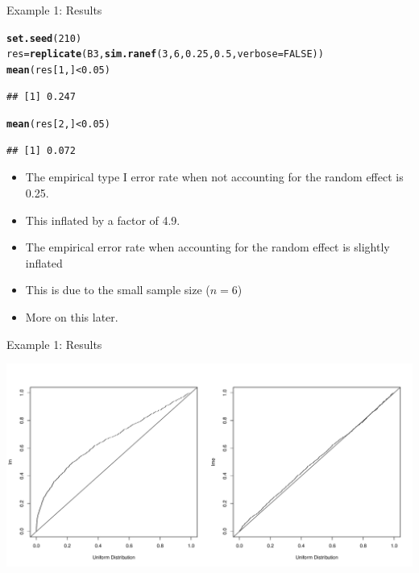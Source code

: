 \documentclass[xcolor=x11names,compress]{beamer}\usepackage[]{graphicx}\usepackage[]{color}
\makeatletter
\newcommand{\hlnum}[1]{\textcolor[rgb]{0.686,0.059,0.569}{#1}}%
\newcommand{\hlopt}[1]{\textcolor[rgb]{0,0,0}{#1}}%
\newcommand{\hlstd}[1]{\textcolor[rgb]{0.345,0.345,0.345}{#1}}%
\newcommand{\hlkwb}[1]{\textcolor[rgb]{0.69,0.353,0.396}{#1}}%
\newcommand{\hlkwc}[1]{\textcolor[rgb]{0.333,0.667,0.333}{#1}}%
\newcommand{\hlkwd}[1]{\textcolor[rgb]{0.737,0.353,0.396}{\textbf{#1}}}%
\newenvironment{kframe}{%
 \def\at@end@of@kframe{}%
 \ifinner\ifhmode%
  \def\at@end@of@kframe{\end{minipage}}%
  \begin{minipage}{\columnwidth}%
 \fi\fi%
 \def\FrameCommand##1{\hskip\@totalleftmargin \hskip-\fboxsep
 \colorbox{shadecolor}{##1}\hskip-\fboxsep
     \hskip-\linewidth \hskip-\@totalleftmargin \hskip\columnwidth}%
 \MakeFramed {\advance\hsize-\width
   \@totalleftmargin\z@ \linewidth\hsize
   \@setminipage}}%
 {\par\unskip\endMakeFramed%
 \at@end@of@kframe}
\newenvironment{knitrout}{}{} %
\makeatother
\begin{document}
\begin{frame}[fragile]{Example 1: Results}
\begin{knitrout}\tiny
{}\color{fgcolor}\begin{kframe}
\begin{alltt}
\hlkwd{set.seed}\hlstd{(}\hlnum{210}\hlstd{)}
\hlstd{res}\hlkwb{=}\hlkwd{replicate}\hlstd{(B3,}\hlkwd{sim.ranef}\hlstd{(}\hlnum{3}\hlstd{,}\hlnum{6}\hlstd{,}\hlnum{0.25}\hlstd{,}\hlnum{0.5}\hlstd{,}\hlkwc{verbose}\hlstd{=}\hlnum{FALSE}\hlstd{))}
\hlkwd{mean}\hlstd{(res[}\hlnum{1}\hlstd{,]}\hlopt{<}\hlnum{0.05}\hlstd{)}
\end{alltt}
\begin{verbatim}
## [1] 0.247
\end{verbatim}
\begin{alltt}
\hlkwd{mean}\hlstd{(res[}\hlnum{2}\hlstd{,]}\hlopt{<}\hlnum{0.05}\hlstd{)}
\end{alltt}
\begin{verbatim}
## [1] 0.072
\end{verbatim}
\end{kframe}
\end{knitrout}
\begin{itemize}
\item The empirical type I error rate when not accounting for the random
      effect is 0.25.
\item This inflated by a factor of 4.9.
\item The empirical error rate when accounting for the random effect
  is slightly inflated
\item This is due to the small sample size ($n=6$)
\item More on this later.
\end{itemize}
\end{frame}


\begin{frame}[fragile]{Example 1: Results}
\begin{knitrout}\tiny
{}\color{fgcolor}

{\centering \includegraphics[width=1.1\linewidth]{figure/beamer-unnamed-chunk-33-1} 

}



\end{knitrout}
\end{frame}
\end{document}
